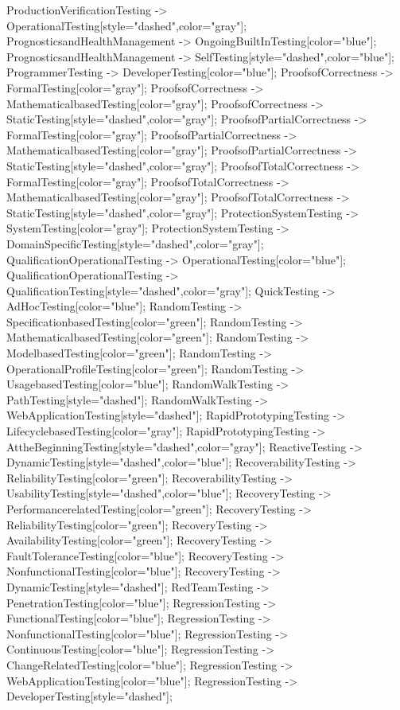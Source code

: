 \documentclass{article}
\begin{document}
{ProductionVerificationTesting -> OperationalTesting[style="dashed",color="gray"];
PrognosticsandHealthManagement -> OngoingBuiltInTesting[color="blue"];
PrognosticsandHealthManagement -> SelfTesting[style="dashed",color="blue"];
ProgrammerTesting -> DeveloperTesting[color="blue"];
ProofsofCorrectness -> FormalTesting[color="gray"];
ProofsofCorrectness -> MathematicalbasedTesting[color="gray"];
ProofsofCorrectness -> StaticTesting[style="dashed",color="gray"];
ProofsofPartialCorrectness -> FormalTesting[color="gray"];
ProofsofPartialCorrectness -> MathematicalbasedTesting[color="gray"];
ProofsofPartialCorrectness -> StaticTesting[style="dashed",color="gray"];
ProofsofTotalCorrectness -> FormalTesting[color="gray"];
ProofsofTotalCorrectness -> MathematicalbasedTesting[color="gray"];
ProofsofTotalCorrectness -> StaticTesting[style="dashed",color="gray"];
ProtectionSystemTesting -> SystemTesting[color="gray"];
ProtectionSystemTesting -> DomainSpecificTesting[style="dashed",color="gray"];
QualificationOperationalTesting -> OperationalTesting[color="blue"];
QualificationOperationalTesting -> QualificationTesting[style="dashed",color="gray"];
QuickTesting -> AdHocTesting[color="blue"];
RandomTesting -> SpecificationbasedTesting[color="green"];
RandomTesting -> MathematicalbasedTesting[color="green"];
RandomTesting -> ModelbasedTesting[color="green"];
RandomTesting -> OperationalProfileTesting[color="green"];
RandomTesting -> UsagebasedTesting[color="blue"];
RandomWalkTesting -> PathTesting[style="dashed"];
RandomWalkTesting -> WebApplicationTesting[style="dashed"];
RapidPrototypingTesting -> LifecyclebasedTesting[color="gray"];
RapidPrototypingTesting -> AttheBeginningTesting[style="dashed",color="gray"];
ReactiveTesting -> DynamicTesting[style="dashed",color="blue"];
RecoverabilityTesting -> ReliabilityTesting[color="green"];
RecoverabilityTesting -> UsabilityTesting[style="dashed",color="blue"];
RecoveryTesting -> PerformancerelatedTesting[color="green"];
RecoveryTesting -> ReliabilityTesting[color="green"];
RecoveryTesting -> AvailabilityTesting[color="green"];
RecoveryTesting -> FaultToleranceTesting[color="blue"];
RecoveryTesting -> NonfunctionalTesting[color="blue"];
RecoveryTesting -> DynamicTesting[style="dashed"];
RedTeamTesting -> PenetrationTesting[color="blue"];
RegressionTesting -> FunctionalTesting[color="blue"];
RegressionTesting -> NonfunctionalTesting[color="blue"];
RegressionTesting -> ContinuousTesting[color="blue"];
RegressionTesting -> ChangeRelatedTesting[color="blue"];
RegressionTesting -> WebApplicationTesting[color="blue"];
RegressionTesting -> DeveloperTesting[style="dashed"];
}
\end{document}
